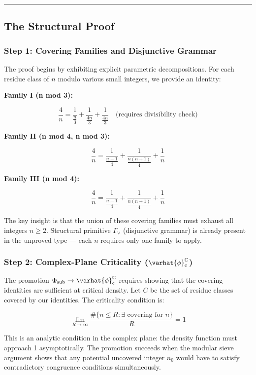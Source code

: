 \documentclass[12pt,a4paper]{article}
\begin{document}
\begin{center}
\rule{0.5\textwidth}{0.4pt}
\end{center}

\subsection{The Structural Proof}

\subsubsection{Step 1: Covering Families and Disjunctive Grammar}

The proof begins by exhibiting explicit parametric decompositions. For each residue class of $n$ modulo various small integers, we provide an identity:

\textbf{Family I (n  mod 3):}


\[\frac{4}{n} = \frac{1}{\frac{n}{3}} + \frac{1}{\frac{4n}{3}} + \frac{1}{\frac{4n}{3}} \quad \text{(requires divisibility check)}\]

\textbf{Family II (n  mod 4, n  mod 3):}


\[\frac{4}{n} = \frac{1}{\frac{n+1}{4}} + \frac{1}{\frac{n(n+1)}{4}} + \frac{1}{n}\]

\textbf{Family III (n  mod 4):}


\[\frac{4}{n} = \frac{1}{\frac{n+1}{4}} + \frac{1}{\frac{n(n+1)}{4}} + \frac{1}{n}\]

The key insight is that the union of these covering families must exhaust all integers $n \geq 2$. Structural primitive $\Gamma_{\vee}$ (disjunctive grammar) is already present in the unproved type --- each $n$ requires only one family to apply.

\subsubsection{Step 2: Complex-Plane Criticality ($\varhat{\phi}^{\mathbb{C}}_\text{c}$)}

The promotion $\Phi_\text{sub} \to \varhat{\phi}^{\mathbb{C}}_\text{c}$ requires showing that the covering identities are sufficient at critical density. Let $C$ be the set of residue classes covered by our identities. The criticality condition is:

\[\lim_{R \to \infty} \frac{\#\{n \leq R : \exists \text{ covering for } n\}}{R} = 1\]

This is an analytic condition in the complex plane: the density function must approach 1 asymptotically. The promotion succeeds when the modular sieve argument shows that any potential uncovered integer $n_0$ would have to satisfy contradictory congruence conditions simultaneously.
\end{document}
